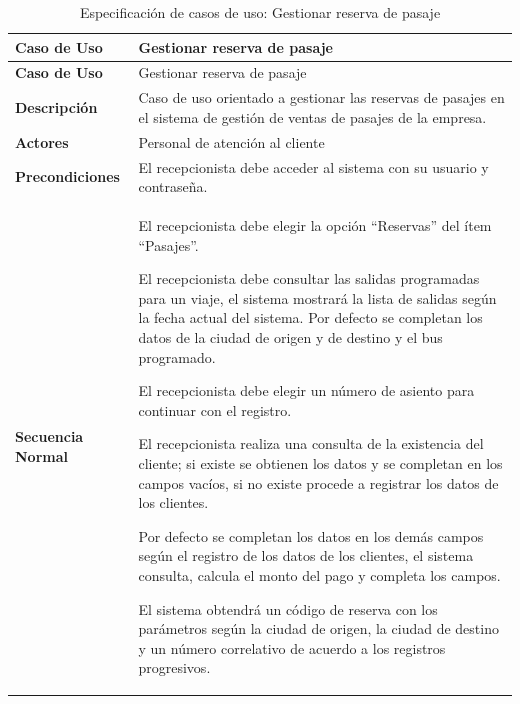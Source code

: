 	\begin{longtable}{m{4cm} m{10.5cm}}
		\caption[Especificación de casos de uso: Gestionar reserva de pasaje]{\newline Especificación de casos de uso: Gestionar reserva de pasaje} \label{tab:tabla3_7}\\
		\toprule
		\textbf{Caso de Uso} & Gestionar reserva de pasaje \\
		\midrule
		\endfirsthead
		
		\toprule
		\textbf{Caso de Uso} & Gestionar reserva de pasaje \\
		\endhead
		
		
		\bottomrule
		\endlastfoot
		
		\textbf{Descripción} & Caso de uso orientado a gestionar las reservas de pasajes en el sistema de gestión de ventas de pasajes de la empresa. \\ \hline
		\textbf{Actores} & Personal de atención al cliente \\ \hline
		\textbf{Precondiciones} & El recepcionista debe acceder al sistema con su usuario y contraseña. \\ \hline
		\textbf{Secuencia Normal} & El recepcionista debe elegir la opción “Reservas” del ítem
		“Pasajes”.
		
		El recepcionista debe consultar las salidas programadas para un viaje, el sistema mostrará la lista de salidas según la fecha actual del sistema. Por defecto se completan los datos de la ciudad de origen y de destino y el bus programado.
		
		El recepcionista debe elegir un número de asiento para continuar con el registro.
		
		El recepcionista realiza una consulta de la existencia del cliente; si existe se obtienen los datos y se completan en los campos vacíos, si no existe procede a registrar los datos de los clientes.
			
		Por defecto se completan los datos en los demás campos según el registro de los datos de los clientes, el sistema consulta, calcula el monto del pago y completa los campos.
		
		El sistema obtendrá un código de reserva con los parámetros según la ciudad de origen, la ciudad de destino y un número correlativo de acuerdo a los registros progresivos.
		

\end{longtable}
